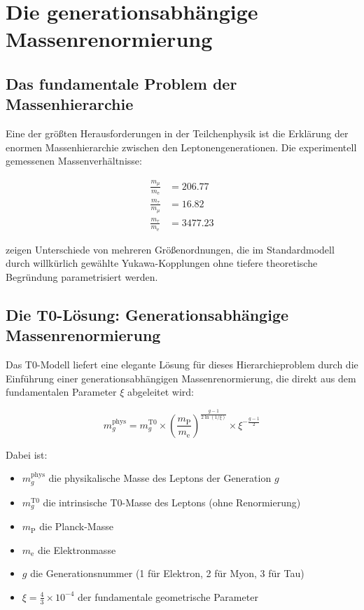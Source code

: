 \documentclass[12pt,a4paper]{article}
\newcommand{\ee}{\text{$\mathrm{e}$}}
\newcommand{\mmu}{\text{$\mu$}}
\newcommand{\ttau}{\text{$\tau$}}
\theoremstyle{definition}
\begin{document}
\section{Die generationsabhängige Massenrenormierung}

\subsection{Das fundamentale Problem der Massenhierarchie}

Eine der größten Herausforderungen in der Teilchenphysik ist die Erklärung der enormen Massenhierarchie zwischen den Leptonengenerationen. Die experimentell gemessenen Massenverhältnisse:

\begin{align}
	\frac{m_{\mmu}}{m_{\ee}} &= 206.77 \\
	\frac{m_{\ttau}}{m_{\mmu}} &= 16.82 \\
	\frac{m_{\ttau}}{m_{\ee}} &= 3477.23
\end{align}

zeigen Unterschiede von mehreren Größenordnungen, die im Standardmodell durch willkürlich gewählte Yukawa-Kopplungen ohne tiefere theoretische Begründung parametrisiert werden.

\subsection{Die T0-Lösung: Generationsabhängige Massenrenormierung}

Das T0-Modell liefert eine elegante Lösung für dieses Hierarchieproblem durch die Einführung einer generationsabhängigen Massenrenormierung, die direkt aus dem fundamentalen Parameter $\xi$ abgeleitet wird:

\begin{equation}
	\boxed{m_g^{\text{phys}} = m_g^{\text{T0}} \times \left(\frac{m_{\text{P}}}{m_{\text{e}}}\right)^{\frac{g-1}{2\ln(1/\xi)}} \times \xi^{-\frac{g-1}{2}}}
\end{equation}

Dabei ist:
\begin{itemize}
	\item $m_g^{\text{phys}}$ die physikalische Masse des Leptons der Generation $g$
	\item $m_g^{\text{T0}}$ die intrinsische T0-Masse des Leptons (ohne Renormierung)
	\item $m_{\text{P}}$ die Planck-Masse
	\item $m_{\text{e}}$ die Elektronmasse
	\item $g$ die Generationsnummer (1 für Elektron, 2 für Myon, 3 für Tau)
	\item $\xi = \frac{4}{3} \times 10^{-4}$ der fundamentale geometrische Parameter
\end{itemize}
\end{document}
